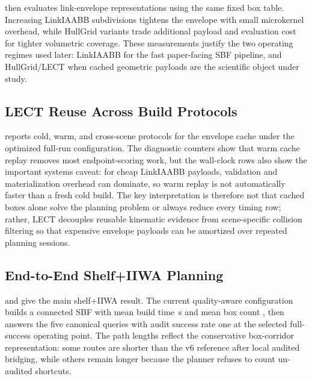 

 then evaluates link-envelope representations using the same fixed box table. Increasing LinkIAABB subdivisions tightens the envelope with small microkernel overhead, while HullGrid variants trade additional payload and evaluation cost for tighter volumetric coverage. These measurements justify the two operating regimes used later: LinkIAABB for the fast paper-facing SBF pipeline, and HullGrid/LECT when cached geometric payloads are the scientific object under study.



\subsection{LECT Reuse Across Build Protocols}\label{sec:exp_lect}

 reports cold, warm, and cross-scene protocols for the envelope cache under the optimized full-run configuration. The diagnostic counters show that warm cache replay removes most endpoint-scoring work, but the wall-clock rows also show the important systems caveat: for cheap LinkIAABB payloads, validation and materialization overhead can dominate, so warm replay is not automatically faster than a fresh cold build. The key interpretation is therefore not that cached boxes alone solve the planning problem or always reduce every timing row; rather, LECT decouples reusable kinematic evidence from scene-specific collision filtering so that expensive envelope payloads can be amortized over repeated planning sessions.



\subsection{End-to-End Shelf+IIWA Planning}\label{sec:exp_marcucci}

 and  give the main shelf+IIWA result. The current quality-aware configuration builds a connected SBF with mean build time \TroSbfBuildMean\,s and mean box count \TroSbfBoxMean, then answers the five canonical queries with audit success rate one at the selected full-success operating point. The path lengths reflect the conservative box-corridor representation: some routes are shorter than the v6 reference after local audited bridging, while others remain longer because the planner refuses to count un-audited shortcuts.

